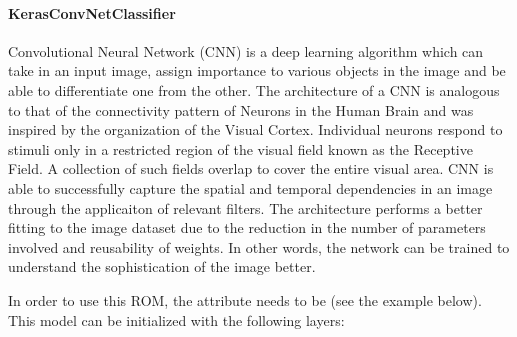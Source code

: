 \paragraph{KerasConvNetClassifier}
\label{KerasClassifier}

Convolutional Neural Network (CNN) is a deep learning algorithm which can take in an input image, assign
importance to various objects in the image and be able to differentiate one from the other. The
architecture of a CNN is analogous to that of the connectivity pattern of Neurons in the Human Brain
and was inspired by the organization of the Visual Cortex. Individual neurons respond to stimuli only
in a restricted region of the visual field known as the Receptive Field. A collection of such fields
overlap to cover the entire visual area. CNN is able to successfully capture the spatial and temporal
dependencies in an image through the applicaiton of relevant filters. The architecture performs
a better fitting to the image dataset due to the reduction in the number of parameters involved
and reusability of weights. In other words, the network can be trained to understand the sophistication
of the image better.


In order to use this ROM, the  attribute  needs to
be  (see the example below). This model can be initialized with
the following layers:

